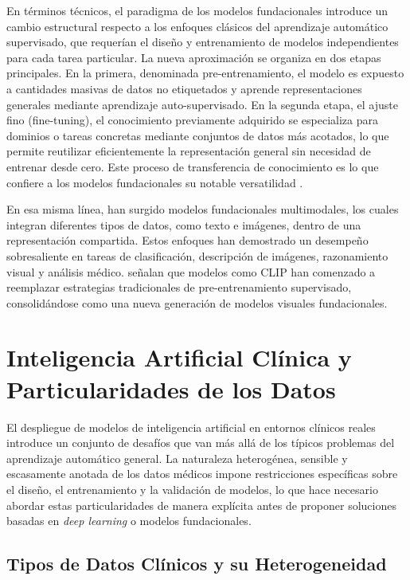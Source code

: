 En términos técnicos, el paradigma de los modelos fundacionales introduce un cambio estructural
respecto a los enfoques clásicos del aprendizaje automático supervisado, que requerían el diseño 
y entrenamiento de modelos independientes para cada tarea particular. La nueva aproximación se 
organiza en dos etapas principales. En la primera, denominada pre-entrenamiento, el modelo es 
expuesto a cantidades masivas de datos no etiquetados y
aprende representaciones generales mediante aprendizaje auto-supervisado.
En la segunda etapa, el ajuste fino (fine-tuning), el conocimiento previamente adquirido se especializa para 
dominios o tareas concretas mediante conjuntos de datos más acotados, lo que permite reutilizar eficientemente la 
representación general sin necesidad de entrenar desde cero. Este proceso de transferencia de
conocimiento es lo que confiere a los modelos fundacionales su notable versatilidad \parencite{Schneider2024}. 

En esa misma línea, han surgido modelos fundacionales multimodales, los cuales integran diferentes 
tipos de datos, como texto e imágenes, dentro de una representación compartida. 
Estos enfoques han demostrado un desempeño sobresaliente en tareas de clasificación, descripción de 
imágenes, razonamiento visual y análisis médico. \textcite{Liu2024} señalan que modelos como CLIP han 
comenzado a reemplazar estrategias tradicionales de pre-entrenamiento
supervisado, consolidándose como una nueva generación de modelos visuales fundacionales.

\section{Inteligencia Artificial Clínica y Particularidades de los Datos}

El despliegue de modelos de inteligencia artificial en entornos clínicos reales introduce un conjunto de 
desafíos que van más allá de los típicos problemas del aprendizaje automático general. La naturaleza 
heterogénea, sensible y escasamente anotada de los datos médicos impone restricciones específicas sobre 
el diseño, el entrenamiento y la validación de modelos, lo que hace necesario abordar estas particularidades 
de manera explícita antes de proponer soluciones basadas en \textit{deep learning} o modelos fundacionales.

\subsection{Tipos de Datos Clínicos y su Heterogeneidad}


